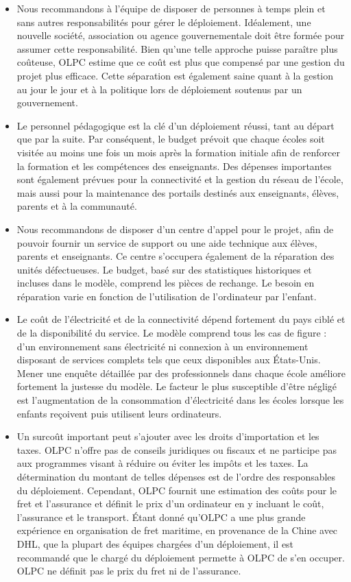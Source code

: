 \documentclass[12pt]{article}
\begin{document}
\begin{itemize}
\item Nous recommandons à l'équipe de disposer de personnes à temps plein et
  sans autres responsabilités pour gérer le déploiement.  Idéalement, une
  nouvelle société, association ou agence gouvernementale doit être formée
  pour assumer cette responsabilité. Bien qu'une telle approche puisse
  paraître plus coûteuse, OLPC estime que ce coût est plus que compensé par
  une gestion du projet plus efficace. Cette séparation est également saine
  quant à la gestion au jour le jour et à la politique lors de déploiement
  soutenus par un gouvernement.
\item Le personnel pédagogique est la clé d'un déploiement réussi, tant au
  départ que par la suite. Par conséquent, le budget prévoit que chaque
  écoles soit visitée au moins une fois un mois après la formation initiale
  afin de renforcer la formation et les compétences des enseignants. Des
  dépenses importantes sont également prévues pour la connectivité et la
  gestion du réseau de l'école, mais aussi pour la maintenance des portails
  destinés aux enseignants, élèves, parents et à la communauté.
\item Nous recommandons de disposer d'un centre d'appel pour le projet, afin de
  pouvoir fournir un service de support ou une aide technique aux élèves,
  parents et enseignants. Ce centre s'occupera également de la réparation
  des unités défectueuses. Le budget, basé sur des statistiques historiques
  et incluses dans le modèle, comprend les pièces de rechange. Le besoin en
  réparation varie en fonction de l'utilisation de l'ordinateur par
  l'enfant.
\item Le coût de l'électricité et de la connectivité dépend fortement du pays
  ciblé et de la disponibilité du service. Le modèle comprend tous les cas
  de figure : d'un environnement sans électricité ni connexion à un
  environnement disposant de services complets tels que ceux disponibles
  aux États-Unis. Mener une enquête détaillée par des professionnels dans
  chaque école améliore fortement la justesse du modèle. Le facteur le plus
  susceptible d'être négligé est l'augmentation de la consommation
  d'électricité dans les écoles lorsque les enfants reçoivent puis
  utilisent leurs ordinateurs.
\item Un surcoût important peut s'ajouter avec les droits d'importation et les
  taxes. OLPC n'offre pas de conseils juridiques ou fiscaux et ne participe
  pas aux programmes visant à réduire ou éviter les impôts et les taxes. La
  détermination du montant de telles dépenses est de l'ordre des
  responsables du déploiement. Cependant, OLPC fournit une estimation des
  coûts pour le fret et l'assurance et définit le prix d'un ordinateur en y
  incluant le coût, l'assurance et le transport. Étant donné qu'OLPC a une
  plus grande expérience en organisation de fret maritime, en provenance de
  la Chine avec DHL, que la plupart des équipes chargées d'un déploiement,
  il est recommandé que le chargé du déploiement permette à OLPC de s'en
  occuper. OLPC ne définit pas le prix du fret ni de l'assurance.
\end{itemize}
\end{document}
